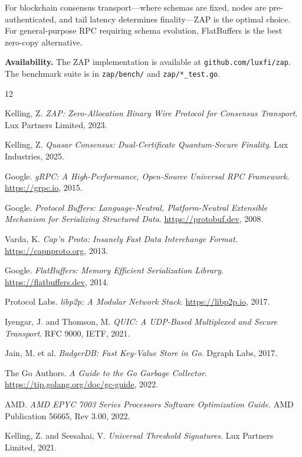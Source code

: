 \documentclass[11pt,letterpaper]{article}
\begin{document}
For blockchain consensus transport---where schemas are fixed, nodes are pre-authenticated, and tail latency determines finality---ZAP is the optimal choice. For general-purpose RPC requiring schema evolution, FlatBuffers is the best zero-copy alternative.

\vspace{1em}
\noindent\textbf{Availability.} The ZAP implementation is available at \texttt{github.com/luxfi/zap}. The benchmark suite is in \texttt{zap/bench/} and \texttt{zap/*\_test.go}.


\begin{thebibliography}{12}

Kelling, Z.
\textit{ZAP: Zero-Allocation Binary Wire Protocol for Consensus Transport}.
Lux Partners Limited, 2023.

Kelling, Z.
\textit{Quasar Consensus: Dual-Certificate Quantum-Secure Finality}.
Lux Industries, 2025.

Google.
\textit{gRPC: A High-Performance, Open-Source Universal RPC Framework}.
\url{https://grpc.io}, 2015.

Google.
\textit{Protocol Buffers: Language-Neutral, Platform-Neutral Extensible Mechanism for Serializing Structured Data}.
\url{https://protobuf.dev}, 2008.

Varda, K.
\textit{Cap'n Proto: Insanely Fast Data Interchange Format}.
\url{https://capnproto.org}, 2013.

Google.
\textit{FlatBuffers: Memory Efficient Serialization Library}.
\url{https://flatbuffers.dev}, 2014.

Protocol Labs.
\textit{libp2p: A Modular Network Stack}.
\url{https://libp2p.io}, 2017.

Iyengar, J. and Thomson, M.
\textit{QUIC: A UDP-Based Multiplexed and Secure Transport}.
RFC 9000, IETF, 2021.

Jain, M. et al.
\textit{BadgerDB: Fast Key-Value Store in Go}.
Dgraph Labs, 2017.

The Go Authors.
\textit{A Guide to the Go Garbage Collector}.
\url{https://tip.golang.org/doc/gc-guide}, 2022.

AMD.
\textit{AMD EPYC 7003 Series Processors Software Optimization Guide}.
AMD Publication 56665, Rev 3.00, 2022.

Kelling, Z. and Seesahai, V.
\textit{Universal Threshold Signatures}.
Lux Partners Limited, 2021.

\end{thebibliography}
\end{document}
